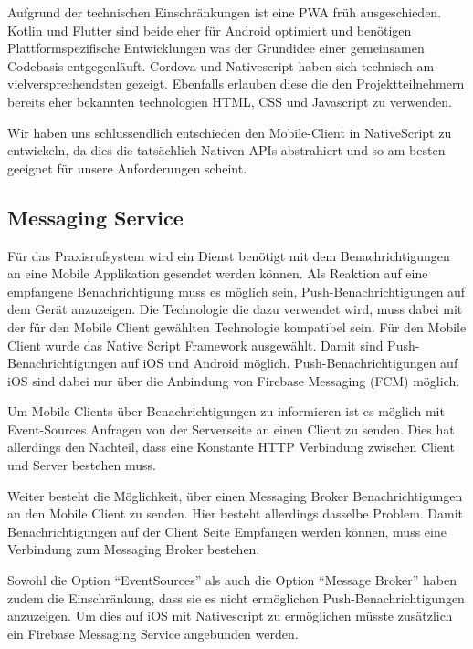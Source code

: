 Aufgrund der technischen Einschränkungen ist eine PWA früh ausgeschieden.
Kotlin und Flutter sind beide eher für Android optimiert und benötigen Plattformspezifische Entwicklungen was der Grundidee einer gemeinsamen Codebasis entgegenläuft.
Cordova und Nativescript haben sich technisch am vielversprechendsten gezeigt.
Ebenfalls erlauben diese die den Projektteilnehmern bereits eher bekannten technologien HTML, CSS und Javascript zu verwenden.

Wir haben uns schlussendlich entschieden den Mobile-Client in NativeScript zu entwickeln, da dies die tatsächlich Nativen APIs abstrahiert und so am besten geeignet für unsere Anforderungen scheint.

\subsection{Messaging Service}\label{subsec:messaging-eval}

Für das Praxisrufsystem wird ein Dienst benötigt mit dem Benachrichtigungen an eine Mobile Applikation gesendet werden können.
Als Reaktion auf eine empfangene Benachrichtigung muss es möglich sein, Push-Benachrichtigungen auf dem Gerät anzuzeigen.
Die Technologie die dazu verwendet wird, muss dabei mit der für den Mobile Client gewählten Technologie kompatibel sein.
Für den Mobile Client wurde das Native Script Framework ausgewählt.
Damit sind Push-Benachrichtigungen auf iOS und Android möglich.
Push-Benachrichtigungen auf iOS sind dabei nur über die Anbindung von Firebase Messaging (FCM) möglich.\cite{nativescript-push}

Um Mobile Clients über Benachrichtigungen zu informieren ist es möglich mit Event-Sources\cite{event-source} Anfragen von der Serverseite an einen Client zu senden.
Dies hat allerdings den Nachteil, dass eine Konstante HTTP Verbindung zwischen Client und Server bestehen muss.

Weiter besteht die Möglichkeit, über einen Messaging Broker Benachrichtigungen an den Mobile Client zu senden.
Hier besteht allerdings dasselbe Problem.
Damit Benachrichtigungen auf der Client Seite Empfangen werden können, muss eine Verbindung zum Messaging Broker bestehen.

Sowohl die Option ``EventSources'' als auch die Option ``Message Broker'' haben zudem die Einschränkung, dass sie es nicht ermöglichen Push-Benachrichtigungen anzuzeigen.
Um dies auf iOS mit Nativescript zu ermöglichen müsste zusätzlich ein Firebase Messaging Service angebunden werden.


